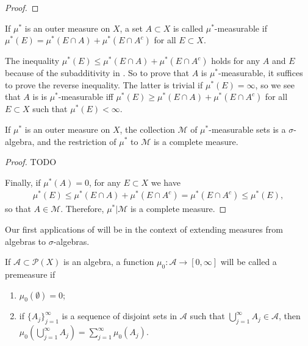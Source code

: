 \begin{proof}

\end{proof}

\begin{definition}
    If $\mu^*$ is an outer measure on $X$, a set $A \subset X$ is called $\mu^*$-measurable if $\mu^*(E) = \mu^*(E \cap A) + \mu^*(E \cap A^c)$ for all $E \subset X$.
\end{definition}

The inequality $\mu^*(E) \le \mu^*(E \cap A) + \mu^*(E \cap A^c)$ holds for any $A$ and $E$ because of the subadditivity in .
So to prove that $A$ is $\mu^*$-measurable, it suffices to prove the reverse inequality.
The latter is trivial if $\mu^*(E) = \infty$, so we see that $A$ is is $\mu^*$-measurable iff $\mu^*(E) \ge \mu^*(E \cap A) + \mu^*(E \cap A^c)$ for all $E \subset X$ such that $\mu^*(E) < \infty$.

\begin{theorem}
    If $\mu^*$ is an outer measure on $X$, the collection $\mathcal{M}$ of $\mu^*$-measurable sets is a $\sigma$-algebra, and the restriction of $\mu^*$ to $\mathcal{M}$ is a complete measure.
\end{theorem}

\begin{proof}
    TODO

    Finally, if $\mu^*(A) = 0$, for any $E \subset X$ we have
    \begin{align}
        \mu^*(E) \le \mu^*(E \cap A) + \mu^*(E \cap A^c) = \mu^*(E \cap A^c) \le \mu^*(E),
    \end{align}
    so that $A \in \mathcal{M}$.
    Therefore, $\mu^*|\mathcal{M}$ is a complete measure.
\end{proof}

Our first applications of  will be in the context of extending measures from algebras to $\sigma$-algebras.

\begin{definition}[Premeasure]
    If $\mathcal{A} \subset \mathcal{P}(X)$ is an algebra, a function $\mu_0: \mathcal{A} \to [0, \infty]$ will be called a premeasure if
    \begin{enumerate}
        \item $\mu_0(\emptyset) = 0$;
        \item if $\{ A_j \}_{j=1}^{\infty}$ is a sequence of disjoint sets in $\mathcal{A}$ such that $\bigcup_{j=1}^{\infty} A_j \in \mathcal{A}$, then $\mu_0(\bigcup_{j=1}^{\infty} A_j) = \sum _{j=1}^{\infty} \mu_0(A_j)$.
    \end{enumerate}
\end{definition}

